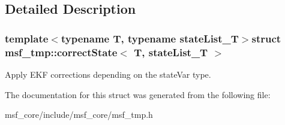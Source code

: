\subsection{Detailed Description}
\subsubsection*{template$<$typename T, typename state\-List\-\_\-\-T$>$struct msf\-\_\-tmp\-::correct\-State$<$ T, state\-List\-\_\-\-T $>$}

Apply E\-K\-F corrections depending on the state\-Var type. 

The documentation for this struct was generated from the following file\-:\begin{DoxyCompactItemize}
\item 
msf\-\_\-core/include/msf\-\_\-core/msf\-\_\-tmp.\-h\end{DoxyCompactItemize}
